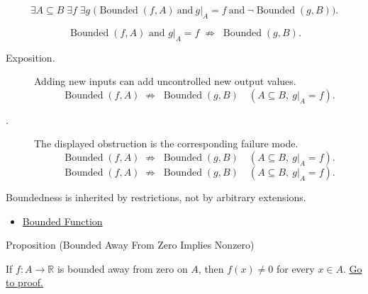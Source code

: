 \begin{remark*}
\[
  \exists A\subseteq B\;\exists f\;\exists g\;
  \bigl(\operatorname{Bounded}(f,A)\ \text{and}\ g|_A=f\ \text{and}\
  \neg\operatorname{Bounded}(g,B)\bigr).
\]
\end{remark*}

\begin{remark*}
\[
  \operatorname{Bounded}(f,A)
  \text{ and } g|_A=f
  \;\not\Longrightarrow\;
  \operatorname{Bounded}(g,B).
\]
\end{remark*}

\begin{remark*}
\begin{description}
  \item[Exposition.]
Adding new inputs can add uncontrolled new output values.
\[
  \operatorname{Bounded}(f,A)
  \;\not\Longrightarrow\;
  \operatorname{Bounded}(g,B)
  \quad (A\subseteq B,\ g|_A=f).
\]


  \item[\exists{}.]
  The displayed obstruction is the corresponding failure mode.
  \[
  \operatorname{Bounded}(f,A)
  \;\not\Longrightarrow\;
  \operatorname{Bounded}(g,B)
  \quad (A\subseteq B,\ g|_A=f).
\]
  \[
  \operatorname{Bounded}(f,A)
  \;\not\Longrightarrow\;
  \operatorname{Bounded}(g,B)
  \quad (A\subseteq B,\ g|_A=f).
\]
\end{description}
\end{remark*}

\begin{remark*}[Interpretation]
Boundedness is inherited by restrictions, not by arbitrary extensions.
\end{remark*}

\begin{dependencies}
\begin{itemize}
  \item \hyperref[def:function-bounded]{Bounded Function}
\end{itemize}
\end{dependencies}

\begin{propositionbox}{Proposition (Bounded Away From Zero Implies Nonzero)}
\begin{proposition}
\label{prop:bounded-away-from-zero-implies-nonzero}
If \(f:A\to\mathbb{R}\) is bounded away from zero on \(A\), then
\(f(x)\neq0\) for every \(x\in A\).
\hyperref[prf:bounded-away-from-zero-implies-nonzero]{Go to proof.}
\end{proposition}
\end{propositionbox}

